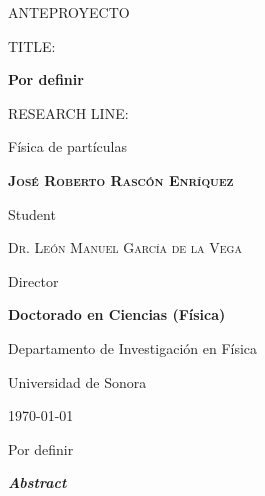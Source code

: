 \documentclass[final,12p]{article}
\def\Student{Jos\'{e} Roberto Rasc\'{o}n Enr\'{i}quez}
\def\Title{ANTEPROYECTO}
\def\Prog{Doctorado en Ciencias (F\'{i}sica) }
\def\Dept{Departamento de Investigaci\'{o}n en F\'{i}sica}
\def\Institution{Universidad de Sonora}
\def\Director{Dr. Le\'on Manuel Garc\'ia de la Vega}
\def\ProjectTitle{Por definir}
\def\ResearchLine{F\'isica de part\'iculas}
\begin{document}
\onehalfspacing

\begin{titlepage}
\centering
\hspace{0pt}
\vfill
{\scshape\Large \Title \par}
  
  \vspace{2cm}
  {
    TITLE:\par
    {\bf \large \ProjectTitle \par}
  }
       
  \vspace{0.5cm}
  {
    RESEARCH LINE: \par
    \ResearchLine \par
  }
        
  \vspace{4cm}
  {\underline{\hspace{8cm}}\par}
  {\bf \scshape \Student \par}
  {Student\par}

  \vspace{1cm}
  {\underline{\hspace{8cm}}\par}
  {\scshape \Director \par}
  {Director\par}

  \vspace{1cm}
  {\bf \Prog \par}
  {\Dept \par}
  {\Institution \par}

  \vspace{4cm}
  {\today}

\hspace{0pt}
\vfill

\end{titlepage}


\shipout\null


\newpage
\hspace{2pt}
\vfill

  \begin{center}
    {\Large \ProjectTitle \par}
    \vspace{1cm}
    {\itshape\textbf{Abstract}\par}
  \end{center}
  
\end{document}
